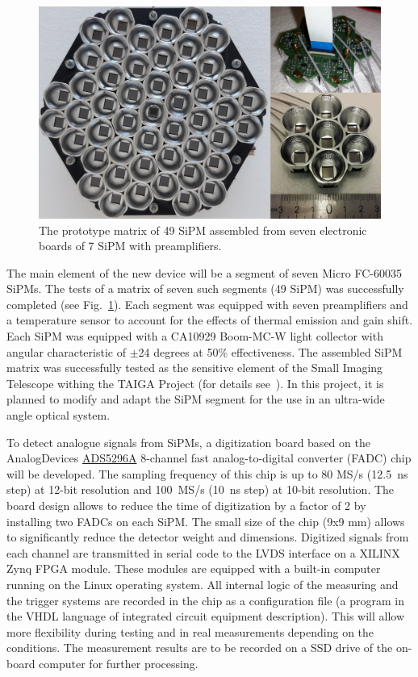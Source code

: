 \documentclass[a4paper,11pt]{article}
\begin{document}
\begin{figure}[t]
\centering %
\includegraphics[width=.55\textwidth]{mosaic_protype.png}
\caption{The prototype matrix of 49 SiPM assembled from seven electronic boards of 7 SiPM with preamplifiers.}
\label{fig:mosaic49_7}
\end{figure}

The main element of the new device will be a segment of seven Micro FC-60035 SiPMs. The tests of a matrix of seven such segments (49 SiPM) was successfully completed (see Fig.~\ref{fig:mosaic49_7}). Each segment was equipped with seven preamplifiers and a temperature sensor to account for the effects of thermal emission and gain shift. Each SiPM was equipped with a CA10929 Boom-MC-W light collector with angular characteristic of $\pm$24 degrees at 50\% effectiveness. The assembled SiPM matrix was successfully tested as the sensitive element of the Small Imaging Telescope withing the TAIGA Project (for details see~\cite{SIT20}). In this project, it is planned to modify and adapt the SiPM segment for the use in an ultra-wide angle optical system.

To detect analogue signals from SiPMs, a digitization board based on the AnalogDevices \href{https://www.ti.com/product/ADS5296A}{ADS5296A} 8-channel fast analog-to-digital converter (FADC) chip will be developed. The sampling frequency of this chip is up to 80 MS/s (12.5~ns step) at 12-bit resolution and 100~MS/s (10~ns step) at 10-bit resolution.
The board design allows to reduce the time of digitization by a factor of 2 by installing two FADCs on each SiPM.
The small size of the chip (9x9 mm) allows to significantly reduce the detector weight and dimensions. 
Digitized signals from each channel are transmitted in serial code to the LVDS interface on a XILINX Zynq FPGA module.
These modules are equipped with a built-in computer running on the Linux operating system.
All internal logic of the measuring and the trigger systems are recorded in the chip as a configuration file (a program in the VHDL language of integrated circuit equipment description). This will allow more flexibility during testing and in real measurements depending on the conditions.
The measurement results are to be recorded on a SSD drive of the on-board computer for further processing.
\end{document}
